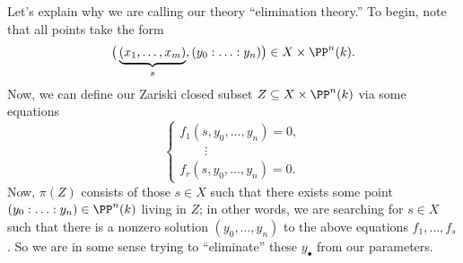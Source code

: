 Let's explain why we are calling our theory ``elimination theory.'' To begin, note that all points take the form
\[\big(\underbrace{(x_1,\ldots,x_m)}_s,(y_0:\ldots:y_n)\big)\in X\times\PP^{n}(k).\]
Now, we can define our Zariski closed subset $Z\subseteq X\times\PP^n(k)$ via some equations
\[\begin{cases}
	f_1(s,y_0,\ldots,y_n)=0, \\
	\quad\quad\vdots \\
	f_r(s,y_0,\ldots,y_n)=0.
\end{cases}\]
Now, $\pi(Z)$ consists of those $s\in X$ such that there exists some point $(y_0:\ldots:y_n)\in\PP^n(k)$ living in $Z$; in other words, we are searching for $s\in X$ such that there is a nonzero solution $(y_0,\ldots,y_n)$ to the above equations $f_1,\ldots,f_s$. So we are in some sense trying to ``eliminate'' these $y_\bullet$ from our parameters.

